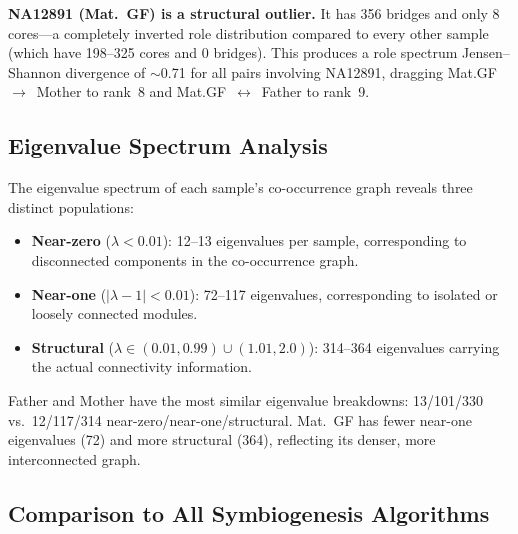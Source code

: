\documentclass{../yalumba}
\begin{document}
\begin{keyfinding}
\textbf{NA12891 (Mat.~GF) is a structural outlier.}  It has 356 bridges and
only 8 cores---a completely inverted role distribution compared to every other
sample (which have 198--325 cores and 0 bridges).  This produces a role
spectrum Jensen--Shannon divergence of $\sim$0.71 for all pairs involving
NA12891, dragging Mat.GF~$\to$~Mother to rank~8 and Mat.GF~$\leftrightarrow$~Father
to rank~9.
\end{keyfinding}

\subsection{Eigenvalue Spectrum Analysis}

The eigenvalue spectrum of each sample's co-occurrence graph reveals three
distinct populations:

\begin{itemize}
  \item \textbf{Near-zero} ($\lambda < 0.01$): 12--13 eigenvalues per sample,
    corresponding to disconnected components in the co-occurrence graph.
  \item \textbf{Near-one} ($|\lambda - 1| < 0.01$): 72--117 eigenvalues,
    corresponding to isolated or loosely connected modules.
  \item \textbf{Structural} ($\lambda \in (0.01, 0.99) \cup (1.01, 2.0)$):
    314--364 eigenvalues carrying the actual connectivity information.
\end{itemize}

Father and Mother have the most similar eigenvalue breakdowns: 13/101/330 vs.\
12/117/314 near-zero/near-one/structural.  Mat.~GF has fewer near-one
eigenvalues (72) and more structural (364), reflecting its denser, more
interconnected graph.

\subsection{Comparison to All Symbiogenesis Algorithms}
\end{document}
